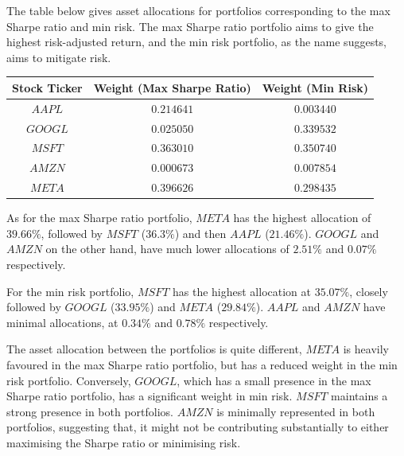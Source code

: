 \documentclass[a4paper,12pt,titlepage]{article}
\numberwithin{equation}{section}
\begin{document}
\begin{tcolorbox}[colback=red!5, colframe=red!75!black, title=\textbf{Max Sharpe Ratio vs Min Risk}]

	The table below gives asset allocations for portfolios corresponding to the max Sharpe ratio and min risk. 
	The max Sharpe ratio portfolio aims to give the highest risk-adjusted return, and the min risk portfolio, 
	as the name suggests, aims to mitigate risk.

\begin{center}
		
		\begin{tabular}{|c|c|c|}
		\hline
		\textbf{Stock Ticker} & \textbf{Weight (Max Sharpe Ratio)} & \textbf{Weight (Min Risk)} \\
		\hline
		$AAPL$ & $0.214641$ & $0.003440$ \\
		\hline
		$GOOGL$ & $0.025050$ & $0.339532$ \\
		\hline
		$MSFT$ & $0.363010$ & $0.350740$ \\
		\hline
		$AMZN$ & $0.000673$ & $0.007854$ \\
		\hline
		$META$ & $0.396626$ & $0.298435$ \\
		\hline
		\end{tabular}

\end{center}

	As for the max Sharpe ratio portfolio, $META$ has the highest allocation of $39.66\%$, followed by $MSFT$ ($36.3\%$) 
	and then $AAPL$ ($21.46\%$). $GOOGL$ and $AMZN$ on the other hand, have much lower allocations of $2.51\%$ and 
	$0.07\%$ respectively. \newline \par \noindent For the min risk portfolio, $MSFT$ has the highest allocation 
	at $35.07\%$, closely followed by $GOOGL$ ($33.95\%$) and $META$ ($29.84\%$). $AAPL$ and $AMZN$ have minimal allocations, 
	at $0.34\%$ and $0.78\%$ respectively. \newline \par \noindent The asset allocation between the portfolios 
	is quite different, $META$ is heavily favoured in the max Sharpe ratio portfolio, but has a reduced weight in the min risk 
	portfolio. Conversely, $GOOGL$, which has a small presence in the max Sharpe ratio portfolio, has a significant weight in min 
	risk. $MSFT$ maintains a strong presence in both portfolios. $AMZN$ is minimally represented in both portfolios, 
	suggesting that, it might not be contributing substantially to either maximising the Sharpe ratio or minimising risk.
	

\end{tcolorbox}
\end{document}
